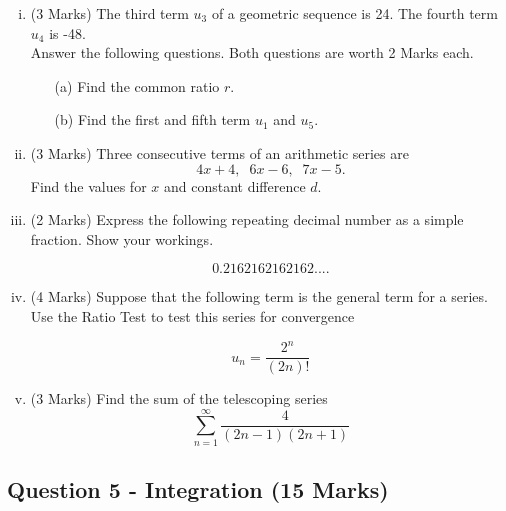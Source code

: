 \documentclass[a4paper,12pt]{article}
\begin{document}
\begin{enumerate}[(i)]
	\item (3 Marks)
	The third term $u_3$ of a geometric sequence is 24. The fourth term $u_4$ is -48. \\ \bigskip Answer the following questions. Both questions are worth 2 Marks each.
	\begin{itemize}
		\item[(a)] Find the common ratio $r$. 
		\item[(b)] Find the first and fifth term $u_1$ and $u_5$.
	\end{itemize}
	
	
	\bigskip
	
	\item (3 Marks)	Three consecutive terms of an arithmetic series are 
	\[4x+4,\;\;6x-6,\;\;7x-5.\]
	Find the values for $x$ and constant difference $d$.
	
		\bigskip
		
		\item (2 Marks) Express the following repeating decimal number as a simple fraction. Show your workings.
		
		\[0.2162162162162....\]
		
	\bigskip
	\item (4 Marks) Suppose that the following term is the general term for a series. Use the Ratio Test to test this series for convergence
	
	\[u_n=\frac{2^n}{(2n)!}\]
	
	\bigskip
	
	\item (3 Marks) Find the sum of the telescoping series  \[ \sum^{\infty}_{n=1} \frac{4
		}{(2n-1)(2n+1)}\]
	

	\newpage

\end{enumerate}
\subsection*{Question 5 - Integration (15 Marks)}



\end{document}
